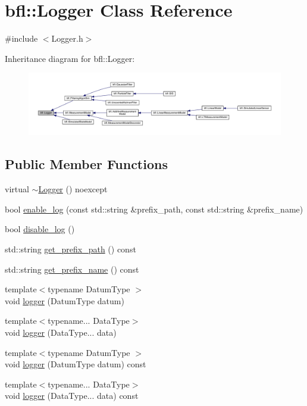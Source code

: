 \hypertarget{classbfl_1_1Logger}{}\section{bfl\+:\+:Logger Class Reference}
\label{classbfl_1_1Logger}


{\ttfamily \#include $<$Logger.\+h$>$}



Inheritance diagram for bfl\+:\+:Logger\+:
\nopagebreak
\begin{figure}[H]
\begin{center}
\leavevmode
\includegraphics[width=350pt]{classbfl_1_1Logger__inherit__graph}
\end{center}
\end{figure}
\subsection*{Public Member Functions}
\begin{DoxyCompactItemize}
\item 
virtual \mbox{\hyperlink{classbfl_1_1Logger_a843a878e056f9c2c835d9bddffb6692a}{$\sim$\+Logger}} () noexcept
\item 
bool \mbox{\hyperlink{classbfl_1_1Logger_ae94b97b6e8d7902e8ce048384813122e}{enable\+\_\+log}} (const std\+::string \&prefix\+\_\+path, const std\+::string \&prefix\+\_\+name)
\item 
bool \mbox{\hyperlink{classbfl_1_1Logger_a440467a28ccc46490d767fe0ef6f556a}{disable\+\_\+log}} ()
\item 
std\+::string \mbox{\hyperlink{classbfl_1_1Logger_a56cf1a4e712bf23d9978420a8a59a62b}{get\+\_\+prefix\+\_\+path}} () const
\item 
std\+::string \mbox{\hyperlink{classbfl_1_1Logger_a913a795b7bfbf378815eeb342d68a7c0}{get\+\_\+prefix\+\_\+name}} () const
\item 
{\footnotesize template$<$typename Datum\+Type $>$ }\\void \mbox{\hyperlink{classbfl_1_1Logger_a1033ff31398484f2132f84fd140da9e3}{logger}} (Datum\+Type datum)
\item 
{\footnotesize template$<$typename... Data\+Type$>$ }\\void \mbox{\hyperlink{classbfl_1_1Logger_aca2086c9256e5c404872b91f7f25b97d}{logger}} (Data\+Type... data)
\item 
{\footnotesize template$<$typename Datum\+Type $>$ }\\void \mbox{\hyperlink{classbfl_1_1Logger_a50b1c109730fa98f66e66f420f0158fe}{logger}} (Datum\+Type datum) const
\item 
{\footnotesize template$<$typename... Data\+Type$>$ }\\void \mbox{\hyperlink{classbfl_1_1Logger_a0f0cf7ce956546d94dfb1feb7cebf171}{logger}} (Data\+Type... data) const
\end{DoxyCompactItemize}
